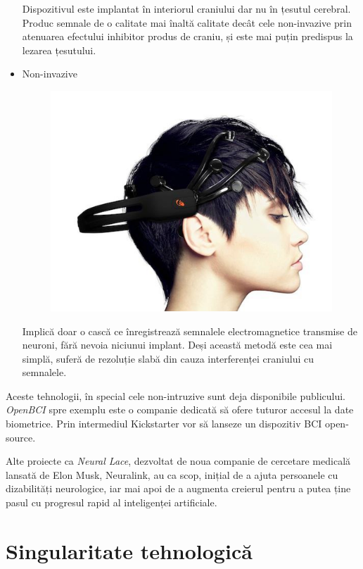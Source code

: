 \begin{itemize}
Dispozitivul este implantat în interiorul craniului dar nu în țesutul cerebral. Produc semnale de o calitate mai înaltă calitate decât cele non-invazive prin atenuarea efectului inhibitor produs de craniu, și este mai puțin predispus la lezarea țesutului.

\item Non-invazive

\begin{figure}[h]
  \centering
  \includegraphics[scale=0.3]{img/noninvasiveBCI.png}
\end{figure}

Implică doar o cască ce înregistrează semnalele electromagnetice transmise de neuroni, fără nevoia niciunui implant. Deși această metodă este cea mai simplă, suferă de rezoluție slabă din cauza interferenței craniului cu semnalele.
\end{itemize}

Aceste tehnologii, în special cele non-intruzive sunt deja disponibile publicului. \textit{OpenBCI} spre exemplu este o companie dedicată să ofere tuturor accesul la date biometrice. Prin intermediul Kickstarter vor să lanseze un dispozitiv BCI open-source.

Alte proiecte ca \textit{Neural Lace}, dezvoltat de noua companie de cercetare medicală lansată de Elon Musk, Neuralink, au ca scop, inițial de a ajuta persoanele cu dizabilități neurologice, iar mai apoi de a augmenta creierul pentru a putea ține pasul cu progresul rapid al inteligenței artificiale.

\section{Singularitate tehnologică}

